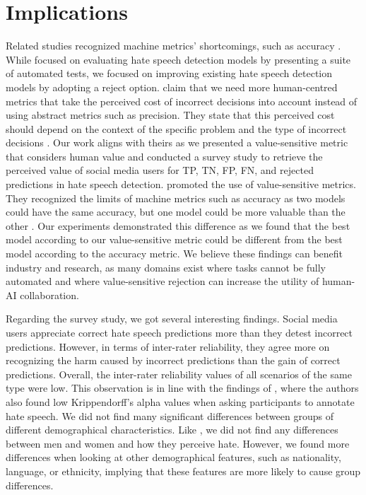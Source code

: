 \section{Implications}
Related studies recognized machine metrics' shortcomings, such as accuracy \citep{casati2021value,olteanu2017limits,rottger2020hatecheck}.
%
%
While \citet{rottger2020hatecheck} focused on evaluating hate speech detection models by presenting a suite of automated tests, we focused on improving existing hate speech detection models by adopting a reject option.
%
\citet{olteanu2017limits} claim that we need more human-centred metrics that take the perceived cost of incorrect decisions into account instead of using abstract metrics such as precision.
%
They state that this perceived cost should depend on the context of the specific problem and the type of incorrect decisions \citep{olteanu2017limits}.
%
Our work aligns with theirs as we presented a value-sensitive metric that considers human value and conducted a survey study to retrieve the perceived value of social media users for TP, TN, FP, FN, and rejected predictions in hate speech detection.
%
%
\citet{casati2021value} promoted the use of value-sensitive metrics.
%
They recognized the limits of machine metrics such as accuracy as two models could have the same accuracy, but one model could be more valuable than the other \citep{casati2021value}.
%
Our experiments demonstrated this difference as we found that the best model according to our value-sensitive metric could be different from the best model according to the accuracy metric.
%
We believe these findings can benefit industry and research, as many domains exist where tasks cannot be fully automated and where value-sensitive rejection can increase the utility of human-AI collaboration.
%

%
Regarding the survey study, we got several interesting findings.
%
Social media users appreciate correct hate speech predictions more than they detest incorrect predictions.
%
However, in terms of inter-rater reliability, they agree more on recognizing the harm caused by incorrect predictions than the gain of correct predictions.
%
Overall, the inter-rater reliability values of all scenarios of the same type were low.
%
This observation is in line with the findings of \citet{ross2017measuring}, where the authors also found low Krippendorff's alpha values when asking participants to annotate hate speech.
%
We did not find many significant differences between groups of different demographical characteristics.
%
Like \citet{gold2018women}, we did not find any differences between men and women and how they perceive hate.
%
However, we found more differences when looking at other demographical features, such as nationality, language, or ethnicity, implying that these features are more likely to cause group differences.
%

